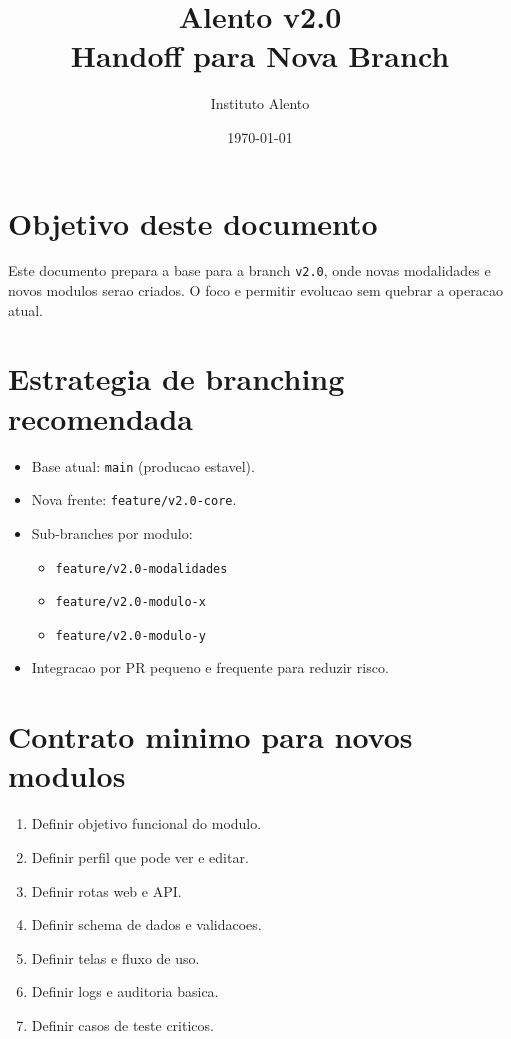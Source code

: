 \documentclass[12pt,a4paper]{article}
\title{Alento v2.0 \\ Handoff para Nova Branch}
\author{Instituto Alento}
\date{\today}
\begin{document}
\maketitle
\tableofcontents
\newpage

\section{Objetivo deste documento}
Este documento prepara a base para a branch \texttt{v2.0}, onde novas modalidades e novos modulos serao criados.
O foco e permitir evolucao sem quebrar a operacao atual.

\section{Estrategia de branching recomendada}
\begin{itemize}[leftmargin=*]
\item Base atual: \texttt{main} (producao estavel).
\item Nova frente: \texttt{feature/v2.0-core}.
\item Sub-branches por modulo:
\begin{itemize}[leftmargin=*]
\item \texttt{feature/v2.0-modalidades}
\item \texttt{feature/v2.0-modulo-x}
\item \texttt{feature/v2.0-modulo-y}
\end{itemize}
\item Integracao por PR pequeno e frequente para reduzir risco.
\end{itemize}

\section{Contrato minimo para novos modulos}
\begin{enumerate}
\item Definir objetivo funcional do modulo.
\item Definir perfil que pode ver e editar.
\item Definir rotas web e API.
\item Definir schema de dados e validacoes.
\item Definir telas e fluxo de uso.
\item Definir logs e auditoria basica.
\item Definir casos de teste criticos.
\end{enumerate}
\end{document}
